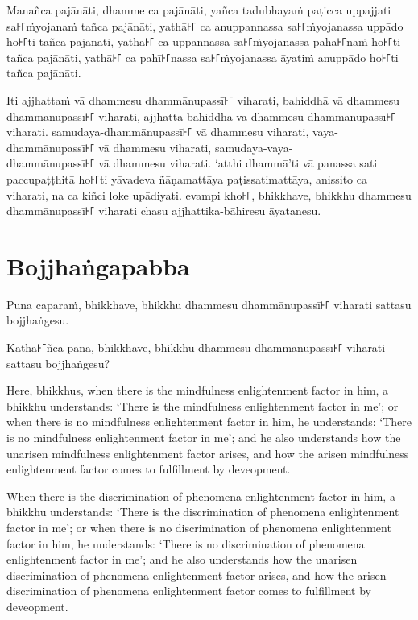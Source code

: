 Manañca pajānāti,
dhamme ca pajānāti,
yañca tadubhayaṁ paṭicca uppajjati sa꜔꜒ṁyojanaṁ tañca pajānāti,
yathā꜔꜒ ca anuppannassa sa꜔꜒ṁyojanassa uppādo ho꜔꜒ti tañca pajānāti,
yathā꜔꜒ ca uppannassa sa꜔꜒ṁyojanassa pahā꜔꜒naṁ ho꜔꜒ti tañca pajānāti,
yathā꜔꜒ ca pahī꜔꜒nassa sa꜔꜒ṁyojanassa āyatiṁ anuppādo ho꜔꜒ti tañca pajānāti.

Iti ajjhattaṁ vā dhammesu dhammānupassī꜔꜒ viharati,
bahiddhā vā dhammesu dhammānupassī꜔꜒ viharati,
ajjhatta-bahiddhā vā dhammesu dhammānupassī꜔꜒ viharati.
samudaya-dhammānupassī꜔꜒ vā dhammesu viharati,
vaya-dhammānupassī꜔꜒ vā dhammesu viharati,
samudaya-vaya-\\ dhammānupassī꜔꜒ vā dhammesu viharati.
‘atthi dhammā’ti vā panassa sati paccupaṭṭhitā ho꜔꜒ti
yāvadeva ñāṇamattāya paṭissatimattāya, anissito ca viharati,
na ca kiñci loke upādiyati. evampi kho꜔꜒, bhikkhave, bhikkhu
dhammesu dhammānupassī꜔꜒ viharati chasu ajjhattika-bāhiresu āyatanesu.


\section*{Bojjhaṅgapabba}

Puna caparaṁ, bhikkhave, bhikkhu dhammesu dhammānupassī꜔꜒ viharati sattasu
bojjhaṅgesu.

Katha꜔꜒ñca pana, bhikkhave, bhikkhu dhammesu dhammānupassī꜔꜒ viharati sattasu
bojjhaṅgesu?

\englishPage

Here, bhikkhus, when there is the mindfulness enlightenment factor in him, a
bhikkhu understands: `There is the mindfulness enlightenment factor in me'; or
when there is no mindfulness enlightenment factor in him, he understands: `There
is no mindfulness enlightenment factor in me'; and he also understands how the
unarisen mindfulness enlightenment factor arises, and how the arisen mindfulness
enlightenment factor comes to fulfillment by deveopment.

When there is the discrimination of phenomena enlightenment factor in him, a
bhikkhu understands: `There is the discrimination of phenomena enlightenment
factor in me'; or when there is no discrimination of phenomena enlightenment
factor in him, he understands: `There is no discrimination of phenomena
enlightenment factor in me'; and he also understands how the unarisen
discrimination of phenomena enlightenment factor arises, and how the arisen
discrimination of phenomena enlightenment factor comes to fulfillment by
deveopment.

